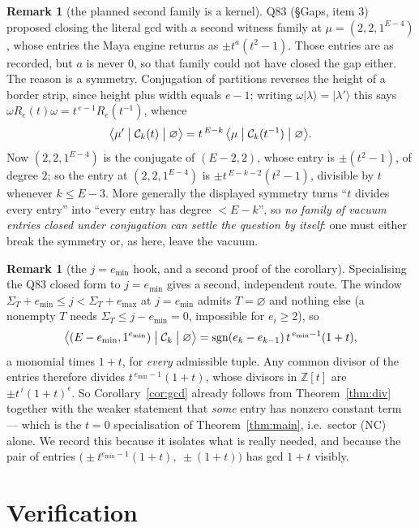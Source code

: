 \documentclass[11pt]{article}
\theoremstyle{definition}
\newtheorem{remark}[theorem]{Remark}
\newcommand{\Ck}{\mathcal{C}}
\newcommand{\Z}{\mathbb{Z}}
\newcommand{\vac}{\varnothing}
\DeclareMathOperator{\sgn}{sgn}
\begin{document}
\begin{remark}[the planned second family is a kernel]\label{rem:kernel}
Q83 (\S Gaps, item 3) proposed closing the literal gcd with a second witness family at
$\mu=(2,2,1^{E-4})$, whose entries the Maya engine returns as $\pm t^{a}(t^2-1)$.  Those entries
are as recorded, but $a$ is never $0$, so that family could not have closed the gap either.  The
reason is a symmetry.  Conjugation of partitions reverses the height of a border strip, since
height plus width equals $e-1$; writing $\omega|\lambda\rangle=|\lambda'\rangle$ this says
$\omega R_e(t)\omega=t^{\,e-1}R_e(t^{-1})$, whence
\[
  \bigl\langle\mu'\bigm|\Ck_k(t)\bigm|\vac\bigr\rangle
  =t^{\,E-k}\,\bigl\langle\mu\bigm|\Ck_k(t^{-1})\bigm|\vac\bigr\rangle .
\]
Now $(2,2,1^{E-4})$ is the conjugate of $(E-2,2)$, whose entry is $\pm(t^2-1)$, of degree $2$;
so the entry at $(2,2,1^{E-4})$ is $\pm t^{\,E-k-2}(t^2-1)$, divisible by $t$ whenever
$k\le E-3$.  More generally the displayed symmetry turns ``$t$ divides every entry'' into
``every entry has degree $<E-k$'', so \emph{no family of vacuum entries closed under conjugation
can settle the question by itself}: one must either break the symmetry or, as here, leave the
vacuum.
\end{remark}

\begin{remark}[the $j=e_{\min}$ hook, and a second proof of the corollary]\label{rem:hook}
Specialising the Q83 closed form to $j=e_{\min}$ gives a second, independent route.  The
window $\Sigma_T+e_{\min}\le j<\Sigma_T+e_{\max}$ at $j=e_{\min}$ admits $T=\varnothing$
and nothing else (a nonempty $T$ needs $\Sigma_T\le j-e_{\min}=0$, impossible for
$e_i\ge2$), so
\[
  \bigl\langle (E-e_{\min},1^{e_{\min}})\bigm|\Ck_k\bigm|\vac\bigr\rangle
  =\sgn(e_k-e_{k-1})\,t^{\,e_{\min}-1}(1+t),
\]
a monomial times $1+t$, for \emph{every} admissible tuple.  Any common divisor of the
entries therefore divides $t^{\,e_{\min}-1}(1+t)$, whose divisors in $\Z[t]$ are
$\pm t^{\,i}(1+t)^{\epsilon}$.  So Corollary~\ref{cor:gcd} already follows from
Theorem~\ref{thm:div} together with the weaker statement that \emph{some} entry has
nonzero constant term --- which is the $t=0$ specialisation of Theorem~\ref{thm:main},
i.e.\ sector (NC) alone.  We record this because it isolates what is really needed, and
because the pair of entries
$\bigl(\pm t^{e_{\min}-1}(1+t),\ \pm(1+t)\bigr)$ has gcd $1+t$ visibly.
\end{remark}

\section{Verification}
\end{document}
